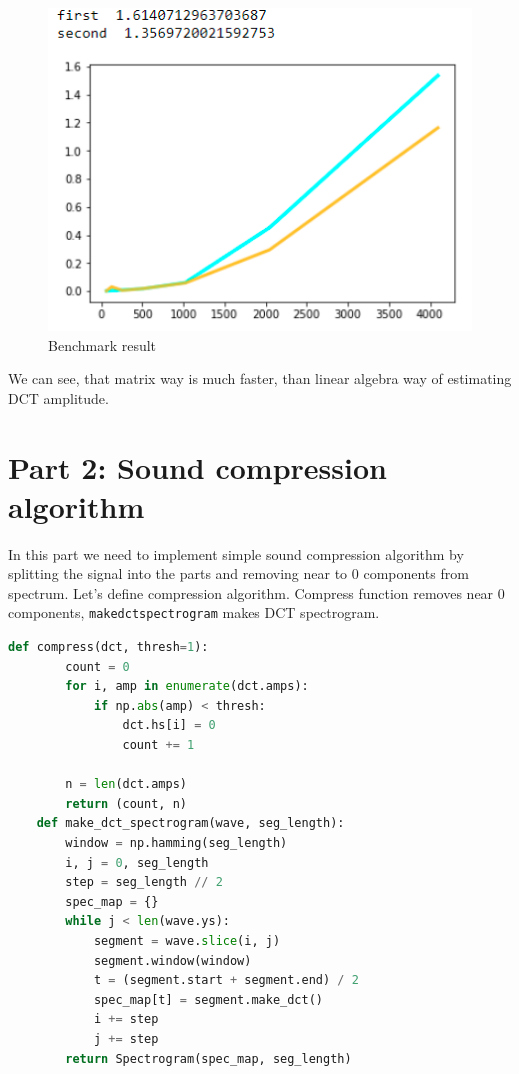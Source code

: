 \documentclass[a4paper]{article}
\begin{document}
        \begin{figure}[H]
            \centering
            \includegraphics[width=\textwidth]{img/funct_anlz.png}
            \caption{Benchmark result}
            \label{fig:part1_1_1}
        \end{figure}
        
        We can see, that matrix way is much faster, than linear algebra way of estimating DCT amplitude.
        
    \newpage
        \section{Part 2: Sound compression algorithm}

        In this part we need to implement simple sound compression algorithm by splitting the signal into the parts and removing near to 0 components from spectrum. Let's define compression algorithm. Compress function removes near 0 components, \texttt{makedctspectrogram} makes DCT spectrogram. 
        
        \begin{lstlisting}[language=Python,caption=Functions definition,label={lst:part1_2}]
    def compress(dct, thresh=1):
        count = 0
        for i, amp in enumerate(dct.amps):
            if np.abs(amp) < thresh:
                dct.hs[i] = 0
                count += 1
                
        n = len(dct.amps)
        return (count, n)
    def make_dct_spectrogram(wave, seg_length):
        window = np.hamming(seg_length)
        i, j = 0, seg_length
        step = seg_length // 2
        spec_map = {}
        while j < len(wave.ys):
            segment = wave.slice(i, j)
            segment.window(window)
            t = (segment.start + segment.end) / 2
            spec_map[t] = segment.make_dct()
            i += step
            j += step
        return Spectrogram(spec_map, seg_length)
        \end{lstlisting}
        
\end{document}
